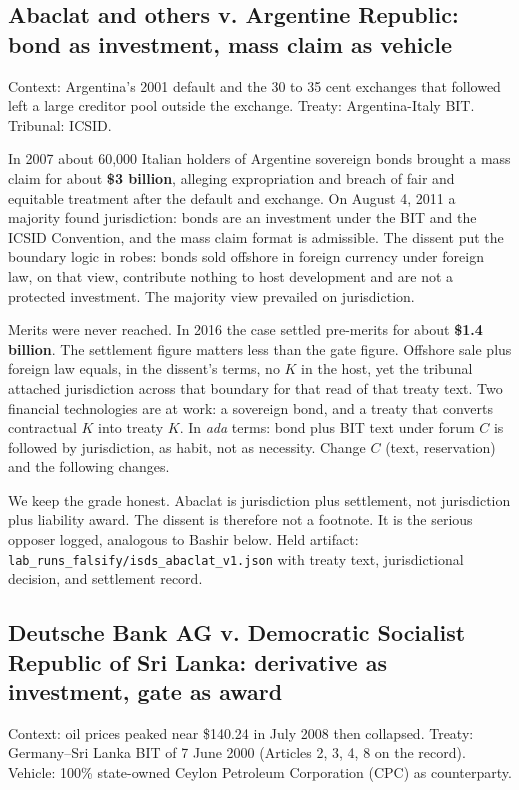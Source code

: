 \subsection{Abaclat and others v. Argentine Republic: bond as investment, mass claim as vehicle}

Context: Argentina's 2001 default and the 30 to 35 cent exchanges that followed left a large creditor pool outside the exchange. Treaty: Argentina-Italy BIT. Tribunal: ICSID.

In 2007 about 60,000 Italian holders of Argentine sovereign bonds brought a mass claim for about \textbf{\$3 billion}, alleging expropriation and breach of fair and equitable treatment after the default and exchange. On August 4, 2011 a majority found jurisdiction: bonds are an investment under the BIT and the ICSID Convention, and the mass claim format is admissible. The dissent put the boundary logic in robes: bonds sold offshore in foreign currency under foreign law, on that view, contribute nothing to host development and are not a protected investment. The majority view prevailed on jurisdiction.

Merits were never reached. In 2016 the case settled pre-merits for about \textbf{\$1.4 billion}. The settlement figure matters less than the gate figure. Offshore sale plus foreign law equals, in the dissent's terms, no $K$ in the host, yet the tribunal attached jurisdiction across that boundary for that read of that treaty text. Two financial technologies are at work: a sovereign bond, and a treaty that converts contractual $K$ into treaty $K$. In \textit{ada} terms: bond plus BIT text under forum $C$ is followed by jurisdiction, as habit, not as necessity. Change $C$ (text, reservation) and the following changes.

We keep the grade honest. Abaclat is jurisdiction plus settlement, not jurisdiction plus liability award. The dissent is therefore not a footnote. It is the serious opposer logged, analogous to Bashir below. Held artifact: \texttt{lab\_runs\_falsify/isds\_abaclat\_v1.json} with treaty text, jurisdictional decision, and settlement record.

\subsection{Deutsche Bank AG v. Democratic Socialist Republic of Sri Lanka: derivative as investment, gate as award}

Context: oil prices peaked near \$140.24 in July 2008 then collapsed. Treaty: Germany--Sri Lanka BIT of 7 June 2000 (Articles 2, 3, 4, 8 on the record). Vehicle: 100\% state-owned Ceylon Petroleum Corporation (CPC) as counterparty.

